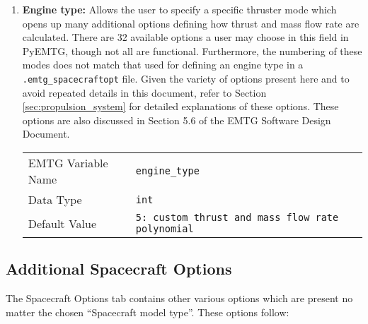 \begin{enumerate}
    \item \textbf{Engine type:} Allows the user to specify a specific thruster mode which opens up many additional options defining how thrust and mass flow rate are calculated. There are 32 available options a user may choose in this field in PyEMTG, though not all are functional. Furthermore, the numbering of these modes does not match that used for defining an engine type in a {\tt .emtg\_spacecraftopt} file. Given the variety of options present here and to avoid repeated details in this document, refer to Section \ref{sec:propulsion_system} for detailed explanations of these options. These options are also discussed in Section 5.6 of the \ac{EMTG} Software Design Document.
    \begin{table}[H]
        \hspace{2cm}
        \begin{tabular}{lp{5cm}}
        \ac{EMTG} Variable Name & \verb|engine_type| \\
        Data Type & \verb|int| \\
        Default Value & \verb|5: custom thrust and mass flow rate polynomial| \\
        \end{tabular}
    \end{table}
\end{enumerate}


\subsection{Additional Spacecraft Options}
The Spacecraft Options tab contains other various options which are present no matter the chosen ``Spacecraft model type''. These options follow:

